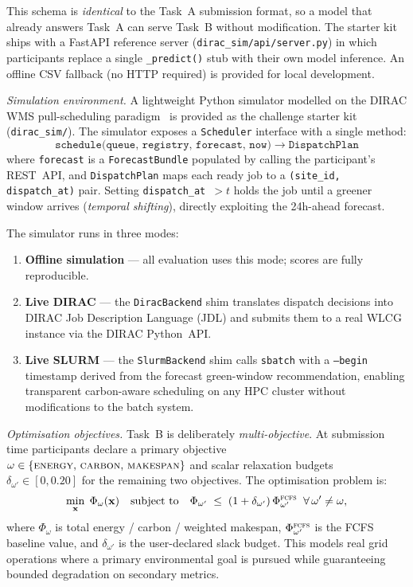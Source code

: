 \noindent
This schema is \emph{identical} to the Task~A submission format, so a model
that already answers Task~A can serve Task~B without modification.
The starter kit ships with a FastAPI reference server
(\texttt{dirac\_sim/api/server.py}) in which participants replace a single
\texttt{\_predict()} stub with their own model inference.
An offline CSV fallback (no HTTP required) is provided for local development.

\medskip
\noindent\textit{Simulation environment.}
A lightweight Python simulator modelled on the DIRAC WMS
pull-scheduling paradigm~\cite{Tsaregorodtsev2010,Casajus2010} is provided
as the challenge starter kit (\texttt{dirac\_sim/}).
The simulator exposes a \texttt{Scheduler} interface with a single method:
\[
  \texttt{schedule(queue,\ registry,\ forecast,\ now)}
  \;\longrightarrow\;
  \texttt{DispatchPlan}
\]
where \texttt{forecast} is a \texttt{ForecastBundle} populated by calling the
participant's REST~API, and \texttt{DispatchPlan} maps each ready job to a
\texttt{(site\_id,\,dispatch\_at)} pair.
Setting \texttt{dispatch\_at}~$> t$ holds the job until a greener window
arrives (\emph{temporal shifting}), directly exploiting the 24h-ahead forecast.

The simulator runs in three modes:
\begin{enumerate}
  \item \textbf{Offline simulation} — all evaluation uses this mode;
        scores are fully reproducible.
  \item \textbf{Live DIRAC} — the \texttt{DiracBackend} shim translates
        dispatch decisions into DIRAC Job Description Language (JDL) and
        submits them to a real WLCG instance via the DIRAC Python~API.
  \item \textbf{Live SLURM} — the \texttt{SlurmBackend} shim calls
        \texttt{sbatch} with a \texttt{--begin} timestamp derived from the
        forecast green-window recommendation, enabling transparent carbon-aware
        scheduling on any HPC cluster without modifications to the batch
        system.
\end{enumerate}

\medskip
\noindent\textit{Optimisation objectives.}
Task~B is deliberately \emph{multi-objective}.
At submission time participants declare a primary objective
$\omega \in \{\textsc{energy},\,\textsc{carbon},\,\textsc{makespan}\}$
and scalar relaxation budgets $\delta_{\omega'} \in [0, 0.20]$ for the
remaining two objectives.
The optimisation problem is:
\[
  \min_{\mathbf{x}}\;\Phi_\omega(\mathbf{x})
  \quad\text{subject to}\quad
  \Phi_{\omega'} \;\le\; (1+\delta_{\omega'})\,\Phi_{\omega'}^{\textsc{fcfs}}
  \;\;\forall\,\omega' \neq \omega,
\]
where $\Phi_\omega$ is total energy / carbon / weighted makespan,
$\Phi_{\omega'}^{\textsc{fcfs}}$ is the FCFS baseline value, and
$\delta_{\omega'}$ is the user-declared slack budget.
This models real grid operations where a primary environmental goal is pursued
while guaranteeing bounded degradation on secondary metrics.

